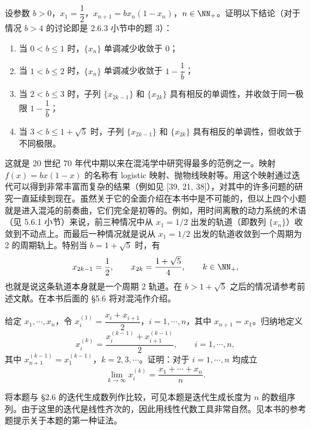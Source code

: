 \begin{xreferenceproblem}[19]
设参数 $b>0$，$x_1=\dfrac12$，$x_{n+1}=bx_n(1-x_n)$，$n\in\NN_+$。证明以下结论（对于情况 $b>4$ 的讨论即是 2.6.3 小节中的题 3）：
  \begin{enumerate}[label=(\arabic*)]
    \item 当 $0<b\le1$ 时，$\{x_n\}$ 单调减少收敛于 0；
    \item 当 $1<b\le2$ 时，$\{x_n\}$ 单调减少收敛于 $1-\dfrac1b$；
    \item 当 $2<b\le3$ 时，子列 $\{x_{2k-1}\}$ 和 $\{x_{2k}\}$ 具有相反的单调性，并收敛于同一极限 $1-\dfrac1b$；
    \item 当 $3<b\le1+\sqrt5$ 时，子列 $\{x_{2k-1}\}$ 和 $\{x_{2k}\}$ 具有相反的单调性，但收敛于不同极限。
  \end{enumerate}

  \begin{xremark}
  这就是 20 世纪 70 年代中期以来在混沌学中研究得最多的范例之一。映射 $f(x)=bx(1-x)$ 的名称有 logistic 映射、抛物线映射等。用这个映射通过迭代可以得到非常丰富而复杂的结果（例如见 [39, 21, 38]），对其中的许多问题的研究一直延续到现在。虽然关于它的全面介绍在本书中是不可能的，但以上四个小题就是进入混沌的前奏曲，它们完全是初等的。例如，用时间离散的动力系统的术语（见 5.6.1 小节）来说，前三种情况中从 $x_1=1/2$ 出发的轨道（即数列 $\{x_n\}$）收敛到不动点上。而最后一种情况就是说从 $x_1=1/2$ 出发的轨道收敛到一个周期为 2 的周期轨上。特别当 $b=1+\sqrt5$ 时，有
  \[
    x_{2k-1}=\frac12,\qquad x_{2k}=\frac{1+\sqrt5}{4},\qquad k\in\NN_+,
  \]
  也就是说这条轨道本身就是一个周期 2 轨道。在 $b>1+\sqrt5$ 之后的情况请参考前述文献。在本书后面的 §5.6 将对混沌作介绍。
  \end{xremark}
\end{xreferenceproblem}

\begin{xreferenceproblem}[20]
给定 $x_1,\cdots,x_n$，令 $x_i^{(1)}=\dfrac{x_i+x_{i+1}}2$，$i=1,\cdots,n$，其中 $x_{n+1}=x_1$。归纳地定义
  \[
    x_i^{(k)}=\frac{x_i^{(k-1)}+x_{i+1}^{(k-1)}}2,
    \qquad i=1,\cdots,n,
  \]
  其中 $x_{n+1}^{(k-1)}=x_1^{(k-1)}$，$k=2,3,\cdots$。证明：对于 $i=1,\cdots,n$ 均成立
  \[
    \lim_{k\to\infty}x_i^{(k)}=\frac{x_1+\cdots+x_n}{n}.
  \]

  \begin{xremark}
  将本题与 §2.6 的迭代生成数列作比较，可见本题是迭代生成长度为 $n$ 的数组序列。由于这里的迭代是线性齐次的，因此用线性代数工具非常自然。见本书的参考题提示关于本题的第一种证法。
  \end{xremark}
\end{xreferenceproblem}

